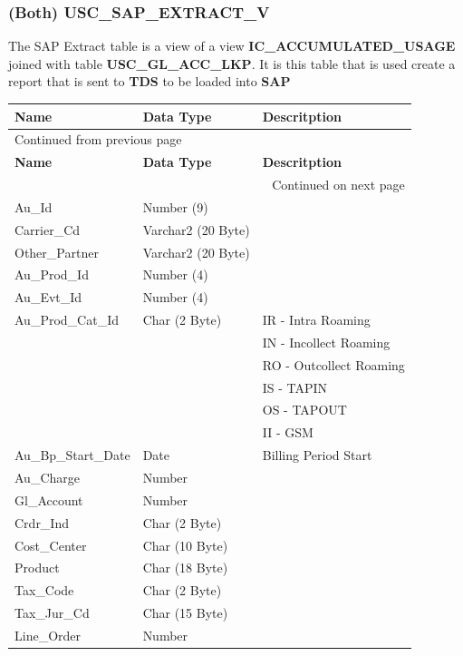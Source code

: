 \documentclass[12pt,twoside]{article}
\begin{document}
\subsubsection{(Both) USC\_SAP\_EXTRACT\_V}
\label{sec:orgheadline77}
The SAP Extract table is a view of a view \textbf{IC\_ACCUMULATED\_USAGE} joined with table \textbf{USC\_GL\_ACC\_LKP}. It is this table that is used create a report that is sent to \textbf{TDS} to be loaded into \textbf{SAP}
\footnotesize

\begin{longtable}{l|l|l}
\hline
\textbf{Name} & \textbf{Data Type} & \textbf{Descritption}\\
\hline
\endfirsthead
\multicolumn{3}{l}{Continued from previous page} \\
\hline

\textbf{Name} & \textbf{Data Type} & \textbf{Descritption} \\

\hline
\endhead
\hline\multicolumn{3}{r}{Continued on next page} \\
\endfoot
\endlastfoot
\hline
Au\_Id & Number (9) & \\
Carrier\_Cd & Varchar2 (20 Byte) & \\
Other\_Partner & Varchar2 (20 Byte) & \\
Au\_Prod\_Id & Number (4) & \\
Au\_Evt\_Id & Number (4) & \\
Au\_Prod\_Cat\_Id & Char (2 Byte) & IR - Intra Roaming\\
 &  & IN - Incollect Roaming\\
 &  & RO - Outcollect Roaming\\
 &  & IS - TAPIN\\
 &  & OS - TAPOUT\\
 &  & II - GSM\\
Au\_Bp\_Start\_Date & Date & Billing Period Start\\
Au\_Charge & Number & \\
Gl\_Account & Number & \\
Crdr\_Ind & Char (2 Byte) & \\
Cost\_Center & Char (10 Byte) & \\
Product & Char (18 Byte) & \\
Tax\_Code & Char (2 Byte) & \\
Tax\_Jur\_Cd & Char (15 Byte) & \\
Line\_Order & Number & \\
\hline
\end{longtable}
\normalsize
\end{document}

